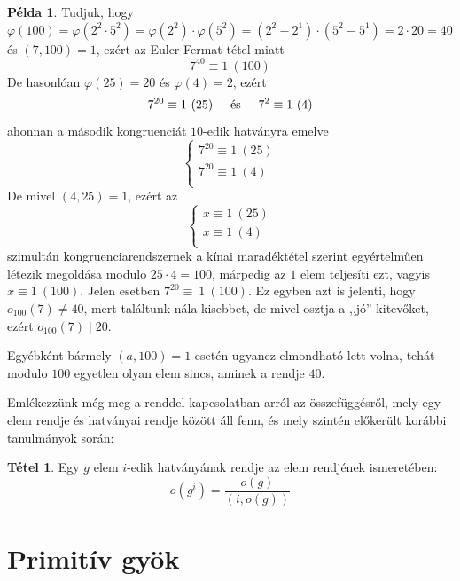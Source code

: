 \documentclass[12pt]{book}
\theoremstyle{plain} %
\theoremstyle{definition} %
\newtheorem{pl}{Példa}[section]
\newtheorem{theo/}{Tétel}[section]
\newenvironment{theo}
  {\renewcommand{\qedsymbol}{$\clubsuit$}%
   \pushQED{\qed}\begin{theo/}}
  {\popQED\end{theo/}}
\theoremstyle{remark}
\renewcommand\qedsymbol{$\blacksquare$}
\numberwithin{equation}{section}  %
\begin{document}
	\begin{pl}\label{maxelemrend}
		Tudjuk, hogy $\varphi(100)=\varphi(2^2\cdot 5^2)=\varphi(2^2)\cdot \varphi(5^2)=(2^2-2^1)\cdot(5^2-5^1)=2\cdot 20 = 40$ és $(7,100)=1$, ezért az Euler-Fermat-tétel miatt
		\[ 7^{40} \equiv 1 \ (100)  \]
		De hasonlóan $\varphi(25)=20$ és $\varphi(4)=2$, ezért
		\[ 7^{20}\equiv 1 \ (25) \hspace{5mm} \text{és} \hspace{5mm} 7^2\equiv 1 \ (4)  \]
		ahonnan a második kongruenciát $10$-edik hatványra emelve
		\[
		\begin{cases*}
		7^{20}\equiv 1 \ (25) \\
		7^{20}\equiv 1 \ (4) \\
		\end{cases*}
		\]
		De mivel $(4,25)=1$, ezért az
		\[
		\begin{cases*}
		x\equiv 1 \ (25) \\
		x\equiv 1 \ (4) \\
		\end{cases*}
		\]
		szimultán kongruenciarendszernek a kínai maradéktétel szerint egyértelműen létezik megoldása modulo $25\cdot 4 = 100$, márpedig az $1$ elem teljesíti ezt, vagyis $x\equiv 1 \ (100)$. Jelen esetben $7^{20} \equiv~1 \ (100)$. Ez egyben azt is jelenti, hogy $o_{100}(7)\neq 40$, mert találtunk nála kisebbet, de mivel osztja a ,,jó'' kitevőket, ezért $o_{100}(7)\mid 20$.
		
		
		Egyébként bármely $(a,100)=1$ esetén ugyanez elmondható lett volna, tehát modulo $100$ egyetlen olyan elem sincs, aminek a rendje $40$.
	
	\end{pl}	

	Emlékezzünk még meg a renddel kapcsolatban arról az összefüggésről, mely egy elem rendje és hatványai rendje között áll fenn, és mely szintén előkerült korábbi tanulmányok során:
	\begin{theo}\label{gi}
		Egy $g$ elem $i$-edik hatványának rendje az elem rendjének ismeretében:
		\[ o(g^i) = \dfrac{o(g)}{(i,o(g))}  \]
	\end{theo}
	
	
	\section{Primitív gyök}
	
\end{document}
